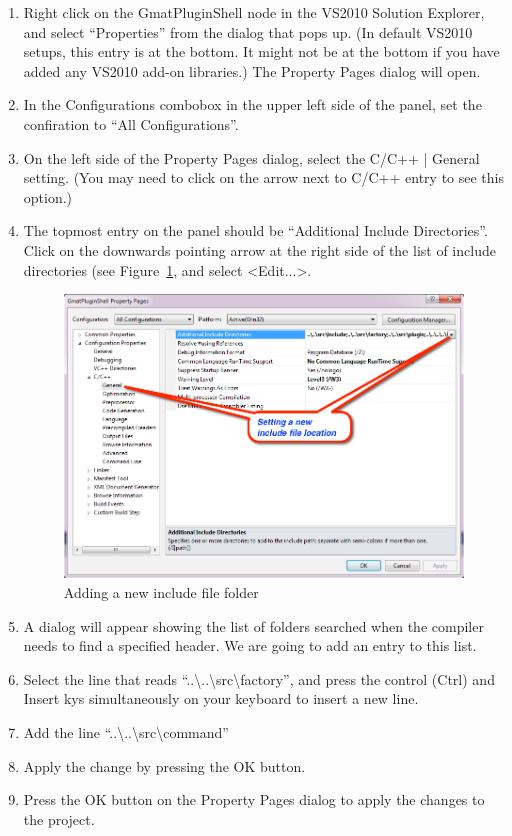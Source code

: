 \documentclass[10pt,letterpaper]{article}
\begin{document}
\begin{enumerate}
\item Right click on the GmatPluginShell node in the VS2010 Solution Explorer, and select ``Properties'' from the dialog that pops up.  (In default VS2010 setups, this entry is at the bottom.  It might not be at the bottom if you have added any VS2010 add-on libraries.)  The Property Pages dialog will open.
\item In the Configurations combobox in the upper left side of the panel, set the confiration to ``All Configurations''. 
\item On the left side of the Property Pages dialog, select the C/C++ | General setting.  (You may need to click on the arrow next to C/C++ entry to see this option.)
\item The topmost entry on the panel should be ``Additional Include Directories''.  Click on the downwards pointing arrow at the right side of the list of include directories (see Figure~\ref{IncludeLoc}, and select {\textless}Edit...{\textgreater}. 
\begin{figure}[htb]
\begin{center}
\includegraphics[scale=0.5]{images/SettingIncludeLocation.png}
\caption{\label{IncludeLoc}Adding a new include file folder}
\end{center}
\end{figure}

\item A dialog will appear showing the list of folders searched when the compiler needs to find a specified header.  We are going to add an entry to this list.
\item Select the line that reads ``..{\textbackslash}..{\textbackslash}src{\textbackslash}factory'', and press the control (Ctrl) and Insert kys simultaneously on your keyboard to insert a new line.
\item Add the line ``..{\textbackslash}..{\textbackslash}src{\textbackslash}command''
\item Apply the change by pressing the OK button.
\item Press the OK button on the Property Pages dialog to apply the changes to the project.
\end{enumerate}
\end{document}
